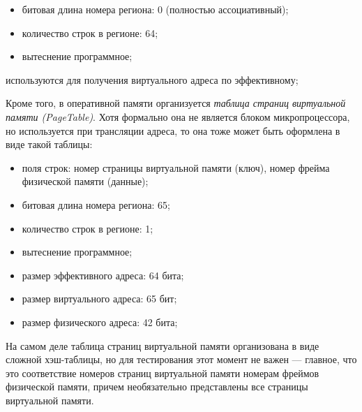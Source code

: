 \begin{itemize}
\begin{itemize}
(данные), биты K$_s$/K$_p$, V, N, L, C (данные);
            \item битовая длина номера региона: 0 (полностью ассоциативный);
            \item количество строк в регионе: 64;
            \item вытеснение программное;
        \end{itemize}
        используются для получения виртуального адреса по эффективному;
\end{itemize}

Кроме того, в оперативной памяти организуется \emph{таблица страниц виртуальной
памяти (PageTable)}. Хотя формально она не является блоком микропроцессора, но
используется при трансляции адреса, то она тоже может быть оформлена в виде
такой таблицы:
    \begin{itemize}
        \item поля строк: номер страницы виртуальной памяти (ключ), номер фрейма
физической памяти (данные);
        \item битовая длина номера региона: 65;
        \item количество строк в регионе: 1;
        \item вытеснение программное;
        \item размер эффективного адреса: 64 бита;
        \item размер виртуального адреса: 65 бит;
        \item размер физического адреса: 42 бита;
    \end{itemize}

На самом деле таблица страниц виртуальной памяти организована в виде сложной
хэш-таблицы, но для тестирования этот момент не важен --- главное, что это
соответствие номеров страниц виртуальной памяти номерам фреймов физической
памяти, причем необязательно представлены все страницы виртуальной памяти.

